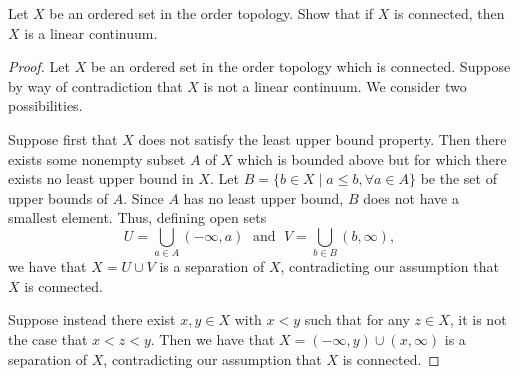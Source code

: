 \begin{exercise}[ID=3.24.4]
  Let $X$ be an ordered set in the order topology.
  Show that if $X$ is connected, then $X$ is a linear continuum.
\end{exercise}
%
\begin{solution}
  \begin{proof}
    Let $X$ be an ordered set in the order topology which is connected.
    Suppose by way of contradiction that $X$ is not a linear continuum.
    We consider two possibilities.

    Suppose first that $X$ does not satisfy the least upper bound property.
    Then there exists some nonempty subset $A$ of $X$ which is bounded above but for which there exists no least upper bound in $X$.
    Let $B = \{ b \in X \mid a \leq b, \forall a \in A \}$ be the set of upper bounds of $A$.
    Since $A$ has no least upper bound, $B$ does not have a smallest element.
    Thus, defining open sets
    \begin{equation*}
      U = \bigcup_{a \in A} (-\infty, a) \; \text{ and }\; V = \bigcup_{b \in B} (b, \infty),
    \end{equation*}
    we have that $X = U \cup V$ is a separation of $X$, contradicting our assumption that $X$ is connected.

    Suppose instead there exist $x, y \in X$ with $x < y$ such that for any $z \in X$, it is not the case that $x < z < y$.
    Then we have that $X = (-\infty, y) \cup (x, \infty)$ is a separation of $X$, contradicting our assumption that $X$ is connected.
  \end{proof}
\end{solution}
\newpage

